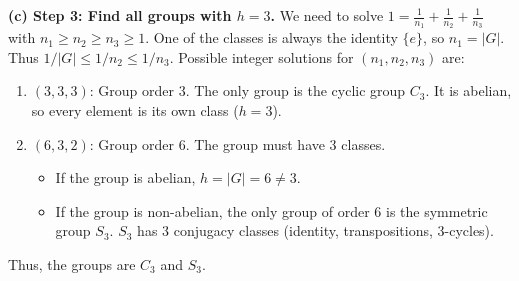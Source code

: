 \begin{solution}
\textbf{(c) Step 3: Find all groups with $h=3$.}
We need to solve $1 = \frac{1}{n_1} + \frac{1}{n_2} + \frac{1}{n_3}$ with $n_1 \geq n_2 \geq n_3 \geq 1$.
One of the classes is always the identity $\{e\}$, so $n_1 = |G|$. Thus $1/|G| \leq 1/n_2 \leq 1/n_3$.
Possible integer solutions for $(n_1, n_2, n_3)$ are:
\begin{enumerate}
    \item $(3, 3, 3)$: Group order 3. The only group is the cyclic group $C_3$. It is abelian, so every element is its own class ($h=3$).
    \item $(6, 3, 2)$: Group order 6. The group must have 3 classes.
    \begin{itemize}
        \item If the group is abelian, $h=|G|=6 \neq 3$.
        \item If the group is non-abelian, the only group of order 6 is the symmetric group $S_3$. $S_3$ has 3 conjugacy classes (identity, transpositions, 3-cycles).
    \end{itemize}
\end{enumerate}
Thus, the groups are \textbf{$C_3$} and \textbf{$S_3$}.
\end{solution}

